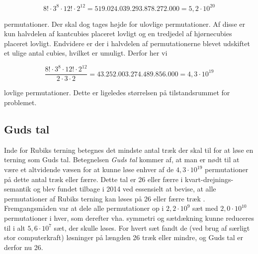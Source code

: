 \documentclass[../main.tex]{subfiles}
\begin{document}
$$8!\cdot3^8\cdot12!\cdot2^{12}=519.024.039.293.878.272.000=5,2\cdot10^{20}$$

permutationer. Der skal dog tages højde for ulovlige permutationer. Af disse er kun halvdelen af kantcubies placeret lovligt og en tredjedel af hjørnecubies placeret lovligt. Endvidere er der i halvdelen af permutationerne blevet udskiftet et ulige antal cubies, hvilket er umuligt. Derfor her vi

$$\frac{8!\cdot3^8\cdot12!\cdot2^{12}}{2\cdot3\cdot2}=43.252.003.274.489.856.000=4,3\cdot10^{19}$$

lovlige permutationer. Dette er ligeledes størrelsen på tilstandsrummet for problemet.

\subsection*{Guds tal}
Inde for Rubiks terning betegnes det mindste antal træk der skal til for at løse en terning som Guds tal. Betegnelsen \emph{Guds tal} kommer af, at man er nødt til at være et altvidende væsen for at kunne løse enhver af de $4,3\cdot10^{19}$ permutationer på dette antal træk eller færre. Dette tal er 26 eller færre i kvart-drejnings-semantik og blev fundet tilbage i 2014 ved essensielt at bevise, at alle permutationer af Rubiks terning kan løses på 26 eller færre træk \cite{10.4169/college.math.j.45.4.242}. Fremgangsmåden var at dele alle permutationer op i $2,2\cdot10^9$ sæt med $2,0\cdot10^{10}$ permutationer i hver, som derefter vha. symmetri og sætdækning kunne reduceres til i alt $5,6\cdot10^7$ sæt, der skulle løses. For hvert sæt fandt de (ved brug af særligt stor computerkraft) løsninger på længden 26 træk eller mindre, og Guds tal er derfor nu 26. 
\end{document}
